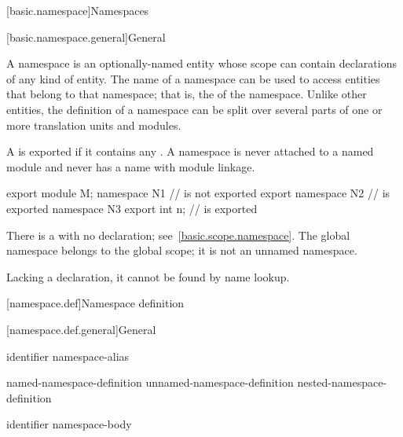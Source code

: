 [basic.namespace]{Namespaces}%

[basic.namespace.general]{General}%

\pnum
A namespace is an optionally-named entity
whose scope can contain declarations of any kind of entity.
The name of a
namespace can be used to access entities that belong to that namespace;
that is, the  of the namespace.
Unlike other entities,
the definition of a namespace can be split over several parts of one or
more translation units and modules.

\pnum
\begin{note}
A  is exported
if it contains any
.
A namespace is never attached to a named module
and never has a name with module linkage.
\end{note}
\begin{example}
\begin{codeblock}
export module M;
namespace N1 {}                 //  is not exported
export namespace N2 {}          //  is exported
namespace N3 { export int n; }  //  is exported
\end{codeblock}
\end{example}

\pnum
There is a  with no declaration;
see~\ref{basic.scope.namespace}.
The global namespace belongs to the global scope;
it is not an unnamed namespace.
\begin{note}
Lacking a declaration, it cannot be found by name lookup.
\end{note}

[namespace.def]{Namespace definition}%

[namespace.def.general]{General}%
%

\begin{bnf}
\br
        identifier\br
        namespace-alias
\end{bnf}

\begin{bnf}
\br
        named-namespace-definition\br
        unnamed-namespace-definition\br
        nested-namespace-definition
\end{bnf}

\begin{bnf}
\br
           identifier \terminal{\{} namespace-body \terminal{\}}
\end{bnf}

